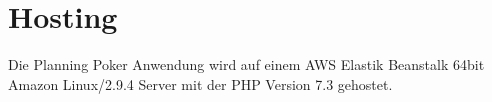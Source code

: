 \chapter{Hosting}
Die Planning Poker Anwendung wird auf einem AWS Elastik Beanstalk 64bit Amazon Linux/2.9.4 Server mit der PHP Version 7.3 gehostet.
